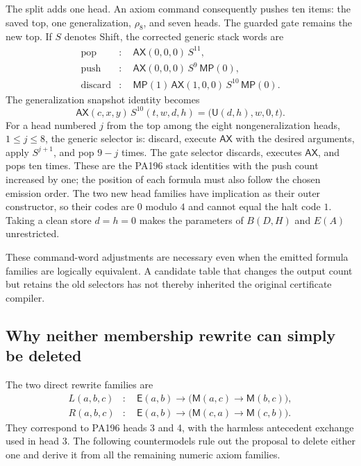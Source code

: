 The split adds one head.  An axiom command consequently pushes ten items:
the saved top, one generalization, $\rho_8$, and seven heads.  The guarded
gate remains the new top.  If $S$ denotes Shift, the corrected generic
stack words are
\[
\begin{aligned}
 \mathrm{pop} &:\quad \mathsf{AX}(0,0,0)\,S^{11},\\
 \mathrm{push}&:\quad \mathsf{AX}(0,0,0)\,S^{9}\,\mathsf{MP}(0),\\
 \mathrm{discard}&:\quad
 \mathsf{MP}(1)\,\mathsf{AX}(1,0,0)\,S^{10}\,\mathsf{MP}(0).
\end{aligned}
\]
The generalization snapshot identity becomes
\[
 \mathsf{AX}(c,x,y)\,S^{10}(t,w,d,h)
   =\bigl(\mathsf U(d,h),w,0,t\bigr).
\]
For a head numbered $j$ from the top among the eight nongeneralization
heads, $1\le j\le8$, the generic selector is: discard, execute
$\mathsf{AX}$ with the desired arguments, apply $S^{j+1}$, and pop
$9-j$ times.  The gate selector discards, executes $\mathsf{AX}$, and
pops ten times.  These are the PA196 stack identities with the push count
increased by one; the position of each formula must also follow the
chosen emission order.  The two new head families have implication as
their outer constructor, so their codes are $0$ modulo $4$ and cannot
equal the halt code $1$.  Taking a clean store $d=h=0$ makes the parameters
of $B(D,H)$ and $E(A)$ unrestricted.

These command-word adjustments are necessary even when the emitted
formula families are logically equivalent.  A candidate table that
changes the output count but retains the old selectors has not thereby
inherited the original certificate compiler.

\subsection{Why neither membership rewrite can simply be deleted}

The two direct rewrite families are
\[
\begin{aligned}
 L(a,b,c)&:\quad
 \mathsf E(a,b)\to\bigl(\mathsf M(a,c)\to\mathsf M(b,c)\bigr),\\
 R(a,b,c)&:\quad
 \mathsf E(a,b)\to\bigl(\mathsf M(c,a)\to\mathsf M(c,b)\bigr).
\end{aligned}
\]
They correspond to PA196 heads 3 and 4, with the harmless antecedent
exchange used in head 3.  The following countermodels rule out the
proposal to delete either one and derive it from all the remaining
numeric axiom families.

